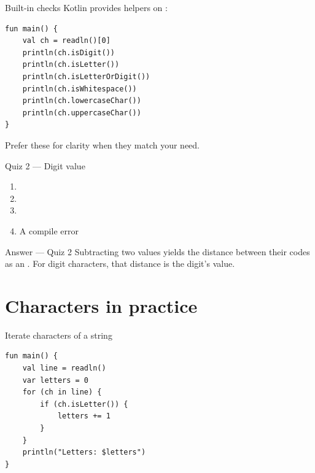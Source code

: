 \documentclass[aspectratio=169,11pt]{beamer}
\begin{document}
    \begin{frame}[fragile]{Built-in checks}
        Kotlin provides helpers on :
        \vspace{0.3em}
        \begin{lstlisting}
fun main() {
    val ch = readln()[0]
    println(ch.isDigit())
    println(ch.isLetter())
    println(ch.isLetterOrDigit())
    println(ch.isWhitespace())
    println(ch.lowercaseChar())
    println(ch.uppercaseChar())
}
        \end{lstlisting}
        Prefer these for clarity when they match your need.
    \end{frame}

    \begin{frame}{Quiz 2 --- Digit value}
        \begin{enumerate}
            \item {}
            \item {}
            \item {}
            \item A compile error
        \end{enumerate}
        \quizpause
    \end{frame}

    \begin{frame}{Answer --- Quiz 2}
        \vspace{0.4em}
        Subtracting two  values yields the distance between their codes
        as an . For digit characters, that distance is the digit's value.
    \end{frame}

    \section{Characters in practice}

    \begin{frame}[fragile]{Iterate characters of a string}
        \begin{lstlisting}
fun main() {
    val line = readln()
    var letters = 0
    for (ch in line) {
        if (ch.isLetter()) {
            letters += 1
        }
    }
    println("Letters: $letters")
}
        \end{lstlisting}
    \end{frame}
\end{document}
